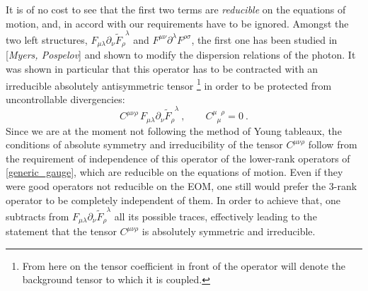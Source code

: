 \documentclass[12pt]{revtex4}
\newcommand{\p}{\partial}
\newcommand{\wt}{\widetilde}
\begin{document}
	It is of no cost to see that the first two terms are {\it reducible}
	on the equations of motion, and, in accord with our requirements
	have to be ignored. 
	Amongst the two left structures, 
$ F_{\mu\lambda} \p_\nu \widetilde{F}_\rho^{\phantom{\rho}\lambda} $ and
$ F^{\mu\nu} \partial^\lambda F^{\rho\sigma} $,
	the first one has been studied in [{\it Myers, Pospelov}] and
	shown to modify the dispersion relations of the photon. 
	It was shown in particular that this operator has to be 
	contracted with an
	irreducible absolutely antisymmetric tensor
	\footnote{
	From here on the tensor coefficient in front of the operator
	will denote the background tensor to which it is coupled.}
	in order to be protected from uncontrollable divergencies:
\begin{equation}
\label{QED_gauge}
	C^{\mu\nu\rho}\, F_{\mu\lambda} \p_\nu 
	\wt{F}_\rho^{\phantom{\rho}\lambda}~,
	\qquad C^{\mu\phantom{\mu}\rho}_{\phantom{\mu}\mu} = 0~.
\end{equation}
	Since we are at the moment not following the method of Young tableaux,
	the conditions of absolute symmetry and irreducibility of
	the tensor $ C^{\mu\nu\rho} $ follow from the requirement of
	independence of this operator of the lower-rank operators
	of \eqref{generic_gauge}, which are reducible on the equations
	of motion.
	Even if they were good operators not reducible on the EOM, 
	one still would prefer the 3-rank operator to be completely independent
	of them.
	In order to achieve that, one subtracts from 
$ F_{\mu\lambda} \p_\nu \wt{F}_\rho^{\phantom{\rho}\lambda} $
	all its possible traces, effectively leading to the statement
	that the tensor $ C^{\mu\nu\rho} $ is absolutely symmetric
	and irreducible.
\end{document}
